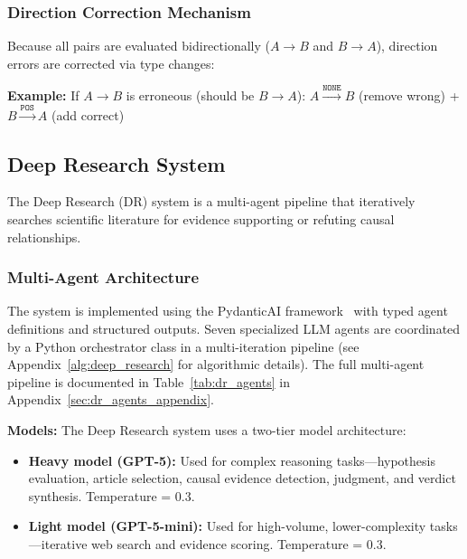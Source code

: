 \subsubsection{Direction Correction Mechanism}
Because all pairs are evaluated bidirectionally ($A \rightarrow B$ and $B \rightarrow A$), direction errors are corrected via type changes:

\textbf{Example:} If $A \rightarrow B$ is erroneous (should be $B \rightarrow A$):
$A \xrightarrow{\texttt{NONE}} B$ (remove wrong) + $B \xrightarrow{\texttt{POS}} A$ (add correct)

\subsection{Deep Research System}
\label{sec:deep_research_system}

The Deep Research (DR) system is a multi-agent pipeline that iteratively searches scientific literature for evidence supporting or refuting causal relationships.

\subsubsection{Multi-Agent Architecture}

The system is implemented using the PydanticAI framework~\cite{pydanticai2024} with typed agent definitions and structured outputs. Seven specialized LLM agents are coordinated by a Python orchestrator class in a multi-iteration pipeline (see Appendix~\ref{alg:deep_research} for algorithmic details). The full multi-agent pipeline is documented in Table~\ref{tab:dr_agents} in Appendix~\ref{sec:dr_agents_appendix}.

\textbf{Models:} The Deep Research system uses a two-tier model architecture:
\begin{itemize}[noitemsep]
    \item \textbf{Heavy model (GPT-5):} Used for complex reasoning tasks---hypothesis evaluation, article selection, causal evidence detection, judgment, and verdict synthesis. Temperature = 0.3.
    \item \textbf{Light model (GPT-5-mini):} Used for high-volume, lower-complexity tasks---iterative web search and evidence scoring. Temperature = 0.3.
\end{itemize}

